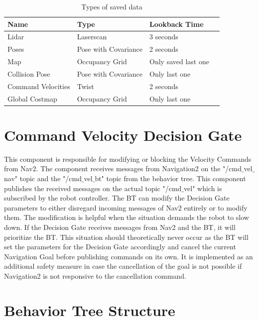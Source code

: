 \begin{center}
\begin{table}[ht]
	\caption{Types of saved data}
	\label{tab:data_backup_types}
	\begin{tabular}{ | m{} | m{}| m{} | m{} |} 
  	\hline
  	\textbf{Name} & \textbf{Type} & \textbf{Lookback Time} \\ 
  	\hline
  	Lidar & Laserscan & 3 seconds \\
  	\hline
  	Poses & Pose with Covariance & 2 seconds\\ 
  	\hline
  	Map & Occupancy Grid & Only saved last one \\ 
  	\hline
  	Collision Pose & Pose with Covariance & Only last one \\
  	\hline
  	Command Velocities & Twist & 2 seconds\\
  	\hline  	
  	Global Costmap & Occupancy Grid & Only last one \\
  	\hline
	\end{tabular}
\end{table}
\end{center}


\section{Command Velocity Decision Gate}

This component is responsible for modifying or blocking the Velocity Commands from Nav2. The component receives messages from Navigation2 on the "/cmd$\_$vel$\_$nav" topic and the "/cmd$\_$vel$\_$bt" topic from the behavior tree. This component publishes the received messages on the actual topic "/cmd$\_$vel" which is subscribed by the robot controller. 
The BT can modify the Decision Gate parameters to either disregard incoming messages of Nav2 entirely or to modify them. The modification is helpful when the situation demands the robot to slow down. 
If the Decision Gate receives messages from Nav2 and the BT, it will prioritize the BT. This situation should theoretically never occur as the BT will set the parameters for the Decision Gate accordingly and cancel the current Navigation Goal before publishing commands on its own. It is implemented as an additional safety measure in case the cancellation of the goal is not possible if Navigation2 is not responsive to the cancellation command. 

\section{Behavior Tree Structure}

